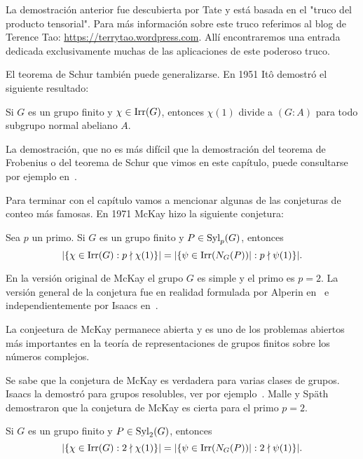 La demostración anterior fue descubierta por Tate y está basada en 
el "truco del producto tensorial". Para más información 
sobre este truco referimos al blog de Terence Tao: 
\url{https://terrytao.wordpress.com}. Allí encontraremos una 
entrada dedicada exclusivamente muchas de las aplicaciones
de este poderoso truco. 

\medskip
El teorema de Schur también puede generalizarse. 
En 1951 It\^o demostró el siguiente resultado: 

\begin{theorem}[It\^o]
Si $G$ es un grupo finito y $\chi\in\operatorname{Irr}(G)$, entonces
$\chi(1)$ divide a $(G:A)$ para todo subgrupo normal abeliano $A$. 
\end{theorem}

La demostración, que no es más difícil que la demostración del 
teorema de Frobenius o del teorema de Schur que vimos en este capítulo, puede consultarse por ejemplo 
en~\cite[\S8.1]{MR0450380}. 

\medskip
Para terminar con el capítulo vamos a mencionar algunas de las conjeturas de conteo más famosas. 
En 1971 McKay hizo la siguiente conjetura:

\begin{conjecture}[McKay]
Sea $p$ un primo. 
Si $G$ es un grupo finito y $P\in\mathrm{Syl}_p(G)$, entonces
\[
|\{\chi\in\operatorname{Irr}(G):p\nmid \chi(1)\}|
=|\{\psi\in\operatorname{Irr}(N_G(P))|:p\nmid\psi(1)\}|.
\]
\end{conjecture}

En la versión original de McKay el grupo $G$ es simple y el primo es $p=2$. La versión general 
de la conjetura fue en realidad formulada por Alperin en~\cite{MR0404417} e independientemente
por Isaacs en~\cite{MR332945}.

La conjeetura de McKay permanece abierta y es uno de los problemas abiertos más importantes 
en la teoría de representaciones de grupos finitos sobre los números complejos. 

Se sabe que la conjetura de McKay es verdadera para varias clases de grupos. 
Isaacs la demostró para grupos resolubles, ver por ejemplo~\cite{MR332945,MR3791517}. 
Malle y Sp\"ath demostraron que 
la conjetura de McKay es cierta para el primo $p=2$. 

\begin{theorem}
Si $G$ es un grupo finito y $P\in\mathrm{Syl}_2(G)$, entonces
\[
|\{\chi\in\operatorname{Irr}(G):2\nmid \chi(1)\}|
=|\{\psi\in\operatorname{Irr}(N_G(P))|:2\nmid\psi(1)\}|.
\]
\end{theorem}

